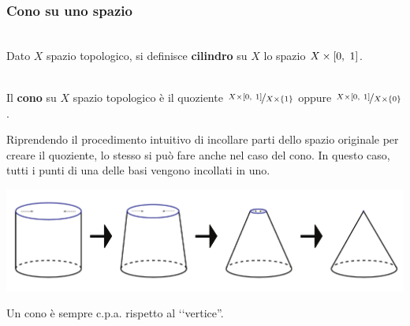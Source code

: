 \subsubsection{Cono su uno spazio}
\begin{define}[Cilindro.]~{}\\
	Dato $X$ spazio topologico, si definisce \textbf{cilindro} su $X$ lo spazio $X\times \left[0,\ 1\right]$.
\end{define}
\begin{define}[Cono.]~{}\\
	Il \textbf{cono} su $X$ spazio topologico è il quoziente $\displaystyle \nicefrac{X\times\left[0,\ 1\right]}{X\times\{1\}}$ oppure $\displaystyle \nicefrac{X\times\left[0,\ 1\right]}{X\times\{0\}}$.
\end{define}
\begin{intuit}
	Riprendendo il procedimento intuitivo di incollare parti dello spazio originale per creare il quoziente, lo stesso si può fare anche nel caso del cono. In questo caso, tutti i punti di una delle basi vengono incollati in uno.
\begin{center}
	\includegraphics[trim=0cm 0cm 0cm 0cm,clip,scale=0.4]{images/cilindertocone.pdf}
\end{center}
\end{intuit}
\begin{observe}
	Un cono è sempre c.p.a. rispetto al ‘‘vertice''.
\end{observe}

